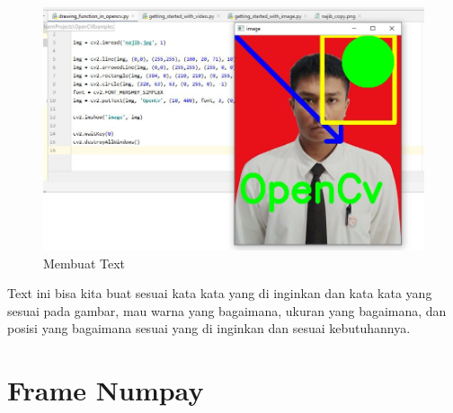 \begin{figure}[ht]
\centering
\includegraphics[scale=0.55]{figures/2,14.jpg}
\caption{Membuat Text}
\label{contoh}
\end{figure}

Text ini bisa kita buat sesuai kata kata yang di inginkan dan kata kata yang sesuai pada gambar, mau warna yang bagaimana, ukuran yang bagaimana, dan posisi yang bagaimana sesuai yang di inginkan dan sesuai kebutuhannya.

\newpage
\section{Frame Numpay}
